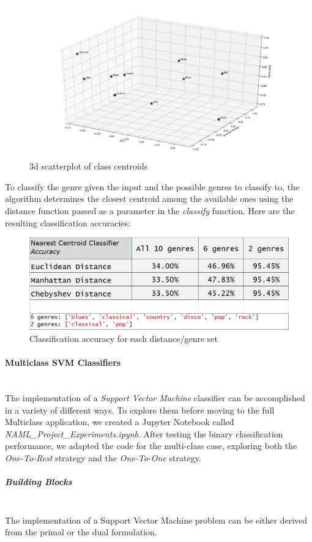 \documentclass[12pt]{article}
\begin{document}
	\begin{figure}[H]
		\hspace{50pt}\includegraphics[scale=0.4]{centroids_plot}
		\caption{3d scatterplot of class centroids}
	\end{figure}

	To classify the genre given the input and the possible genres to classify to, the algorithm determines the closest centroid among the available ones using the distance function passed as a parameter in the \textit{classify} function. Here are the resulting classification accuracies:
	\begin{figure}[H]
		\hspace{70pt}\includegraphics[scale=0.5]{nc_acc}
		\caption{Classification accuracy for each distance/genre set}
	\end{figure}
	
	\paragraph{Multiclass SVM Classifiers}\mbox{}\\\newline
	The implementation of a \textit{Support Vector Machine} classifier can be accomplished in a variety of different ways. To explore them before moving to the full Multiclass application, we created a Jupyter Notebook called \textit{NAML\_Project\_Experiments.ipynb}. After testing the binary classification performance, we adapted the code for the multi-class case, exploring both the \textit{One-To-Rest} strategy and the \textit{One-To-One} strategy.
	\subparagraph{Building Blocks}\mbox{}\\\newline
	The implementation of a Support Vector Machine problem can be either derived from the primal or the dual formulation.
	
\end{document}

